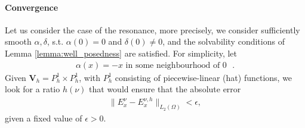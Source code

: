 \paragraph{Convergence}
Let us consider the case of the resonance, more precisely, we consider sufficiently smooth
$\alpha,\delta$, s.t. $\alpha(0)=0$ and $\delta(0)\neq 0$, and the solvability conditions 
of Lemma \ref{lemma:well_posedness}  are satisfied. 
For simplicity, let 
\begin{align}
\label{eq:cond}
 \alpha(x)=-x \text{  in some neighbourhood of $0$ }.
\end{align}
Given $\mathbf{V}_{h}=P_{h}^{1}\times P_{h}^{1}$, with $P_{h}^{1}$ consisting of piecewise-linear (hat) functions, 
we look for a ratio $h(\nu)$ that would ensure that the absolute error 
\begin{align}
\label{eq:problem1}
\|E^{\nu}_{x}-E^{\nu,h}_{x}\|_{L_{2}(\Omega)}<\epsilon,
\end{align}
given a fixed value of $\epsilon>0$. 

